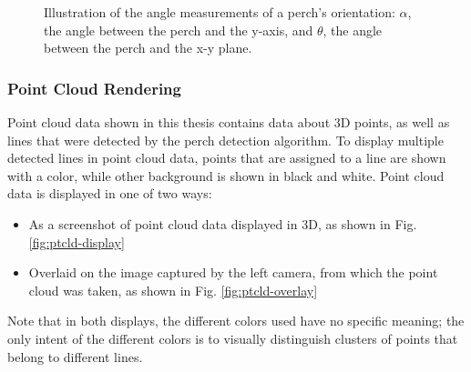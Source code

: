\begin{figure}[H]
    \caption{Illustration of the angle measurements of a perch's orientation: $\alpha$, the angle between the perch
        and the y-axis, and $\theta$, the angle between the perch and the x-y plane.}
    \label{fig:angles}
\end{figure}

\subsubsection{Point Cloud Rendering} \label{sec:conv:ptcld}

Point cloud data shown in this thesis contains data about 3D points, as 
well as lines that were detected by the perch detection algorithm. 
To display multiple detected lines in point cloud data, points that are assigned
to a line are shown with a color, while other background is shown in black and white. 
Point cloud data is displayed in one of two ways:
\begin{itemize}
    \item As a screenshot of point cloud data displayed in 3D, as shown in Fig. \ref{fig:ptcld-display}
    \item Overlaid on the image captured by the left camera, from which the point cloud was taken, 
        as shown in Fig. \ref{fig:ptcld-overlay}
\end{itemize}

Note that in both displays, the different colors used have no specific meaning; the only intent of the different 
colors is to visually distinguish clusters of points that belong to different lines.

